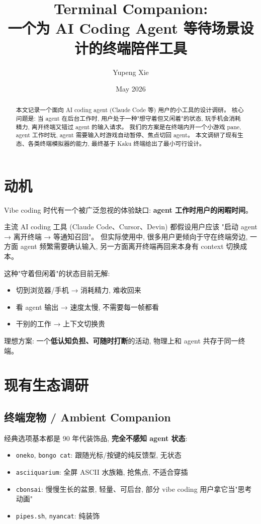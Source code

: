 \documentclass[11pt]{article}
\title{Terminal Companion: \\ \large 一个为 AI Coding Agent 等待场景设计的终端陪伴工具}
\author{Yupeng Xie}
\date{May 2026}
\begin{document}
\maketitle

\begin{abstract}
本文记录一个面向 AI coding agent (Claude Code 等) 用户的小工具的设计调研。
核心问题是: 当 agent 在后台工作时, 用户处于一种"想守着但又闲着"的状态,
玩手机会消耗精力, 离开终端又错过 agent 的输入请求。
我们的方案是在终端内开一个小游戏 pane, agent 工作时玩,
agent 需要输入时游戏自动暂停、焦点切回 agent。
本文调研了现有生态、各类终端模拟器的能力, 最终基于 Kaku 终端给出了最小可行设计。
\end{abstract}

\section{动机}

Vibe coding 时代有一个被广泛忽视的体验缺口:
\textbf{agent 工作时用户的闲暇时间}。

主流 AI coding 工具 (Claude Code、Cursor、Devin) 都假设用户应该
"启动 agent → 离开终端 → 等通知召回"。
但实际使用中, 很多用户更倾向于守在终端旁边, 一方面 agent 频繁需要确认输入,
另一方面离开终端再回来本身有 context 切换成本。

这种"守着但闲着"的状态目前无解:
\begin{itemize}[leftmargin=*]
  \item 切到浏览器/手机 → 消耗精力, 难收回来
  \item 看 agent 输出 → 速度太慢, 不需要每一帧都看
  \item 干别的工作 → 上下文切换贵
\end{itemize}

理想方案: 一个\textbf{低认知负担、可随时打断}的活动, 物理上和 agent 共存于同一终端。

\section{现有生态调研}

\subsection{终端宠物 / Ambient Companion}

经典选项基本都是 90 年代装饰品, \textbf{完全不感知 agent 状态}:
\begin{itemize}[leftmargin=*]
  \item \texttt{oneko}, \texttt{bongo cat}: 跟随光标/按键的纯反馈型, 无状态
  \item \texttt{asciiquarium}: 全屏 ASCII 水族箱, 抢焦点, 不适合穿插
  \item \texttt{cbonsai}: 慢慢生长的盆景, 轻量、可后台, 部分 vibe coding 用户拿它当"思考动画"
  \item \texttt{pipes.sh}, \texttt{nyancat}: 纯装饰
\end{itemize}
\end{document}
